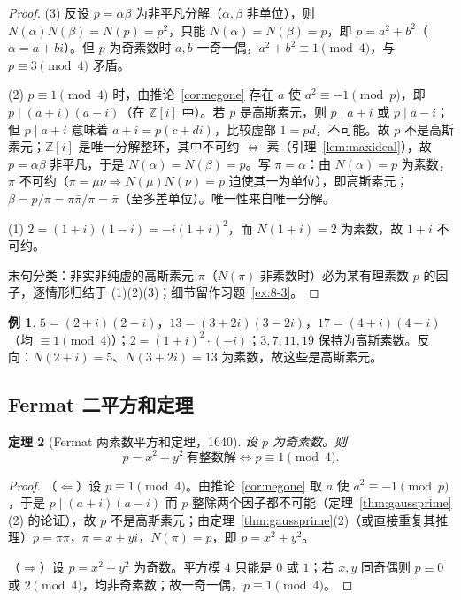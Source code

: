 \documentclass[a4paper,11pt]{ctexart}
\numberwithin{equation}{section}
\theoremstyle{plain}
\newtheorem{theorem}{定理}[section]
\theoremstyle{definition}
\newtheorem{example}[theorem]{例}
\theoremstyle{remark}
\newcommand{\Ga}{\mathbb{Z}[i]}
\begin{document}
\begin{proof}
(3) 反设 $p=\alpha\beta$ 为非平凡分解（$\alpha,\beta$ 非单位），则 $N(\alpha)N(\beta)=N(p)=p^2$，只能 $N(\alpha)=N(\beta)=p$，即 $p=a^2+b^2$（$\alpha=a+bi$）。但 $p$ 为奇素数时 $a,b$ 一奇一偶，$a^2+b^2\equiv1\pmod4$，与 $p\equiv3\pmod4$ 矛盾。

(2) $p\equiv1\pmod4$ 时，由推论~\ref{cor:negone} 存在 $a$ 使 $a^2\equiv-1\pmod p$，即 $p\mid(a+i)(a-i)$（在 $\Ga$ 中）。若 $p$ 是高斯素元，则 $p\mid a+i$ 或 $p\mid a-i$；但 $p\mid a+i$ 意味着 $a+i=p(c+di)$，比较虚部 $1=pd$，不可能。故 $p$ 不是高斯素元；$\Ga$ 是唯一分解整环，其中不可约 $\Leftrightarrow$ 素（引理~\ref{lem:maxideal}），故 $p=\alpha\beta$ 非平凡，于是 $N(\alpha)=N(\beta)=p$。写 $\pi=\alpha$：由 $N(\alpha)=p$ 为素数，$\pi$ 不可约（$\pi=\mu\nu\Rightarrow N(\mu)N(\nu)=p$ 迫使其一为单位），即高斯素元；$\beta=p/\pi=\pi\bar\pi/\pi=\bar\pi$（至多差单位）。唯一性来自唯一分解。

(1) $2=(1+i)(1-i)=-i(1+i)^2$，而 $N(1+i)=2$ 为素数，故 $1+i$ 不可约。

末句分类：非实非纯虚的高斯素元 $\pi$（$N(\pi)$ 非素数时）必为某有理素数 $p$ 的因子，逐情形归结于 (1)(2)(3)；细节留作习题~\ref{ex:8-3}。
\end{proof}

\begin{example}
$5=(2+i)(2-i)$，$13=(3+2i)(3-2i)$，$17=(4+i)(4-i)$（均 $\equiv1\pmod4$）；$2=(1+i)^2\cdot(-i)$；$3,7,11,19$ 保持为高斯素数。反向：$N(2+i)=5$、$N(3+2i)=13$ 为素数，故这些是高斯素元。
\end{example}

\subsection{Fermat 二平方和定理}

\begin{theorem}[Fermat 两素数平方和定理，1640]\label{thm:fermattwo}
设 $p$ 为奇素数。则
\[
p=x^2+y^2\ \text{有整数解}\iff p\equiv1\pmod4 .
\]
\end{theorem}

\begin{proof}
（$\Leftarrow$）设 $p\equiv1\pmod4$。由推论~\ref{cor:negone} 取 $a$ 使 $a^2\equiv-1\pmod p$，于是 $p\mid(a+i)(a-i)$ 而 $p$ 整除两个因子都不可能（定理~\ref{thm:gaussprime}(2) 的论证），故 $p$ 不是高斯素元；由定理~\ref{thm:gaussprime}(2)（或直接重复其推理）$p=\pi\bar\pi$，$\pi=x+yi$，$N(\pi)=p$，即 $p=x^2+y^2$。

（$\Rightarrow$）设 $p=x^2+y^2$ 为奇数。平方模 $4$ 只能是 $0$ 或 $1$；若 $x,y$ 同奇偶则 $p\equiv0$ 或 $2\pmod4$，均非奇素数；故一奇一偶，$p\equiv1\pmod4$。
\end{proof}
\end{document}
